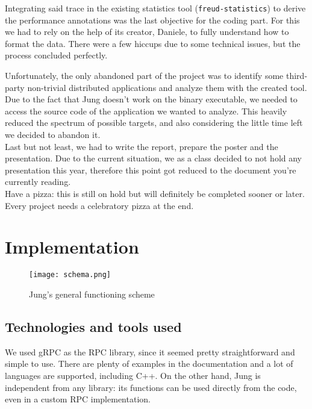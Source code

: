         Integrating said trace in the existing statistics tool (\texttt{freud-statistics}) to derive
        the performance annotations was the last objective for the coding part. For this we had to rely on the
        help of its creator, Daniele, to fully understand how to format the data. There were a few hiccups due to
        some technical issues, but the process concluded perfectly.

        Unfortunately, the only abandoned part of the project was to identify some third-party non-trivial
        distributed applications and analyze them with the created tool. Due to the fact that Jung doesn't work 
        on the binary executable, we needed to access the source code of the application we wanted to 
        analyze. This heavily reduced the spectrum of possible targets, and also considering the little time left we
        decided to abandon it.\\

        Last but not least, we had to write the report, prepare the poster and the presentation. Due to the current
        situation, we as a class decided to not hold any presentation this year, therefore this point got reduced
        to the document you're currently reading.\\
        
        Have a pizza: this is still on hold but will definitely be completed sooner or later. Every project needs
        a celebratory pizza at the end.
        

\chapter{Implementation}

    \begin{figure}[H]
        \centering
        \texttt{[image: schema.png]}
        \caption{Jung's general functioning scheme}
        \label{fig:schema}
    \end{figure}
    

    \section{Technologies and tools used}

        We used gRPC \cite{gRPCdocs} as the RPC library, since it seemed pretty straightforward and simple
        to use. There are plenty of examples in the documentation and a lot of languages are supported,
        including C++. On the other hand, Jung is independent from any library:
        its functions can be used directly from the code, even in a custom RPC implementation.\\

